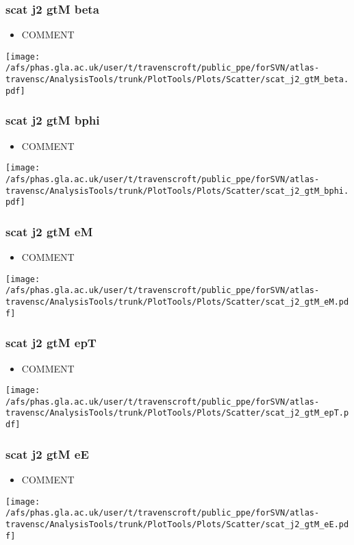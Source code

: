 \documentclass{beamer}
\begin{document}
\begin{frame}
\frametitle{scat j2 gtM beta}
\begin{itemize}
\item COMMENT
\end{itemize}
\begin{center}
\texttt{[image: /afs/phas.gla.ac.uk/user/t/travenscroft/public\_ppe/forSVN/atlas-travensc/AnalysisTools/trunk/PlotTools/Plots/Scatter/scat\_j2\_gtM\_beta.pdf]}
\end{center}
\end{frame}

\begin{frame}
\frametitle{scat j2 gtM bphi}
\begin{itemize}
\item COMMENT
\end{itemize}
\begin{center}
\texttt{[image: /afs/phas.gla.ac.uk/user/t/travenscroft/public\_ppe/forSVN/atlas-travensc/AnalysisTools/trunk/PlotTools/Plots/Scatter/scat\_j2\_gtM\_bphi.pdf]}
\end{center}
\end{frame}

\begin{frame}
\frametitle{scat j2 gtM eM}
\begin{itemize}
\item COMMENT
\end{itemize}
\begin{center}
\texttt{[image: /afs/phas.gla.ac.uk/user/t/travenscroft/public\_ppe/forSVN/atlas-travensc/AnalysisTools/trunk/PlotTools/Plots/Scatter/scat\_j2\_gtM\_eM.pdf]}
\end{center}
\end{frame}

\begin{frame}
\frametitle{scat j2 gtM epT}
\begin{itemize}
\item COMMENT
\end{itemize}
\begin{center}
\texttt{[image: /afs/phas.gla.ac.uk/user/t/travenscroft/public\_ppe/forSVN/atlas-travensc/AnalysisTools/trunk/PlotTools/Plots/Scatter/scat\_j2\_gtM\_epT.pdf]}
\end{center}
\end{frame}

\begin{frame}
\frametitle{scat j2 gtM eE}
\begin{itemize}
\item COMMENT
\end{itemize}
\begin{center}
\texttt{[image: /afs/phas.gla.ac.uk/user/t/travenscroft/public\_ppe/forSVN/atlas-travensc/AnalysisTools/trunk/PlotTools/Plots/Scatter/scat\_j2\_gtM\_eE.pdf]}
\end{center}
\end{frame}
\end{document}
